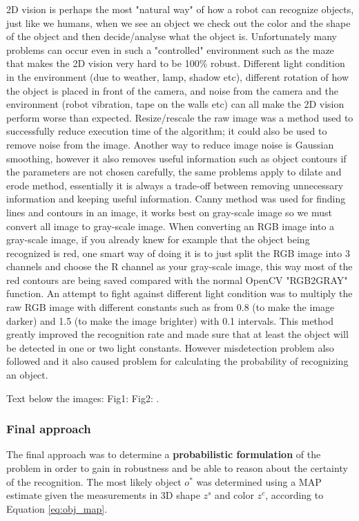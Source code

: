 2D vision is perhaps the most "natural way" of how a robot can recognize objects, just like we humans, when we see an object we check out the color and the shape of the object and then decide/analyse what the object is. Unfortunately many problems can occur even in such a "controlled" environment such as the maze that makes the 2D vision very hard to be 100\% robust. Different light condition in the environment (due to weather, lamp, shadow etc), different rotation of how the object is placed in front of the camera, and noise from the camera and the environment (robot vibration, tape on the walls etc) can all make the 2D vision perform worse than expected. Resize/rescale the raw image was a method used to successfully reduce execution time of the algorithm; it could also be used to remove noise from the image. Another way to reduce image noise is Gaussian smoothing, however it also removes useful information such as object contours if the parameters are not chosen carefully, the same problems apply to dilate and erode method, essentially it is always a trade-off between removing unnecessary information and keeping useful information. Canny method was used for finding lines and contours in an image, it works best on gray-scale image so we must convert all image to gray-scale image. When converting an RGB image into a gray-scale image, if you already knew for example that the object being recognized is red, one smart way of doing it is to just split the RGB image into 3 channels and choose the R channel as your gray-scale image, this way most of the red contours are being saved compared with the normal OpenCV "RGB2GRAY" function. An attempt to fight against different light condition was to multiply the raw RGB image with different constants such as from 0.8 (to make the image darker) and 1.5 (to make the image brighter) with 0.1 intervals. This method greatly improved the recognition rate and made sure that at least the object will be detected in one or two light constants. However misdetection problem also followed and it also caused problem for calculating the probability of recognizing an object.

Text below the images:
Fig1: 
Fig2: .
\subsubsection{Final approach}
The final approach was to determine a \textbf{probabilistic formulation} of the problem in order to gain in robustness and be able to reason about the certainty of the recognition. The most likely object $o^*$ was determined using a MAP estimate given the measurements in 3D shape $z^s$ and color $z^c$, according to Equation \ref{eq:obj_map}.

